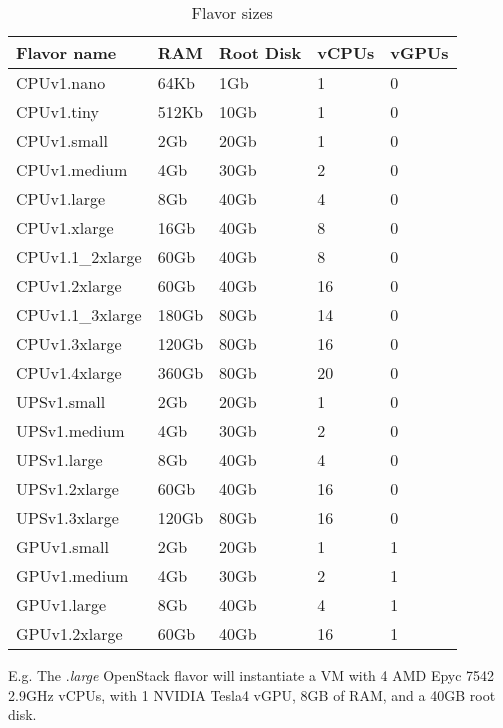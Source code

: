 \begin{table}[h!]
\centering
\begin{tabular}{ |p{3cm}|p{3cm}|p{3cm}|p{3cm}|p{3cm}| }
  \hline
  \rowcolor{lightgray} \textbf{Flavor name} & \textbf{RAM} & \textbf{Root Disk} & \textbf{vCPUs} & \textbf{vGPUs} \\
  \hline
  CPUv1.nano & 64Kb & 1Gb & 1 & 0 \\
  \hline
  CPUv1.tiny & 512Kb & 10Gb & 1 & 0 \\
  \hline
  CPUv1.small & 2Gb & 20Gb & 1 & 0 \\
  \hline
  CPUv1.medium & 4Gb & 30Gb & 2 & 0 \\
  \hline
  CPUv1.large & 8Gb & 40Gb & 4 & 0 \\
  \hline
  CPUv1.xlarge & 16Gb & 40Gb & 8 & 0 \\
  \hline
  CPUv1.1\_2xlarge & 60Gb & 40Gb & 8 & 0 \\
  \hline
  CPUv1.2xlarge & 60Gb & 40Gb & 16 & 0 \\  
  \hline
  CPUv1.1\_3xlarge & 180Gb & 80Gb & 14 & 0 \\
  \hline
  CPUv1.3xlarge & 120Gb & 80Gb & 16 & 0 \\
  \hline
  CPUv1.4xlarge & 360Gb & 80Gb & 20 & 0 \\
  \hline
  UPSv1.small & 2Gb & 20Gb & 1 & 0 \\
  \hline
  UPSv1.medium & 4Gb & 30Gb & 2 & 0 \\
  \hline
  UPSv1.large & 8Gb & 40Gb & 4 & 0 \\
  \hline
  UPSv1.2xlarge & 60Gb & 40Gb & 16 & 0 \\
  \hline
  UPSv1.3xlarge & 120Gb & 80Gb & 16 & 0 \\
  \hline
  GPUv1.small & 2Gb & 20Gb & 1 & 1 \\
  \hline
  GPUv1.medium & 4Gb & 30Gb & 2 & 1 \\
  \hline
  GPUv1.large & 8Gb & 40Gb & 4 & 1 \\
  \hline
  GPUv1.2xlarge & 60Gb & 40Gb & 16 & 1 \\
  \hline
\end{tabular}
\caption{Flavor sizes}
\label{table:flavor-size}
\end{table}


E.g. The .\emph{large} OpenStack flavor will instantiate a
VM with 4 AMD Epyc 7542 2.9GHz vCPUs, with 1 NVIDIA Tesla4 vGPU, 8GB
of RAM, and a 40GB root disk.


